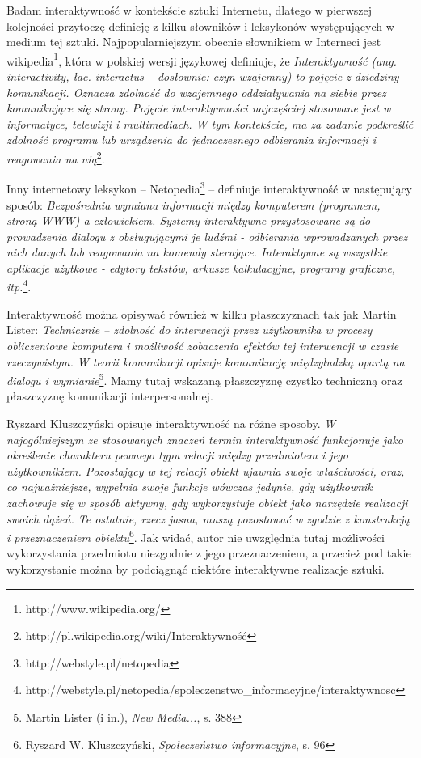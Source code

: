 \documentclass[a4paper,12pt,twoside]{article}
\begin{document}
Badam interaktywność w kontekście sztuki Internetu, dlatego
w pierwszej kolejności przytoczę definicję z kilku słowników i leksykonów
występujących w medium tej sztuki. Najpopularniejszym obecnie słownikiem
w Interneci jest wikipedia\footnote{http://www.wikipedia.org/}, która
w polskiej wersji językowej definiuje, że 
\textit{Interaktywność (ang. interactivity, łac. interactus  – dosłownie:
czyn wzajemny) to pojęcie z dziedziny komunikacji. Oznacza zdolność do
 wzajemnego oddziaływania na siebie przez komunikujące się strony.
Pojęcie interaktywności najczęściej stosowane jest w informatyce, telewizji
i multimediach. W tym kontekście, ma za zadanie podkreślić zdolność programu
lub urządzenia do jednoczesnego odbierania informacji i reagowania na
nią}\footnote{http://pl.wikipedia.org/wiki/Interaktywność}.

Inny internetowy leksykon -- Netopedia\footnote{http://webstyle.pl/netopedia}
-- definiuje interaktywność w następujący sposób:
\textit{Bezpośrednia wymiana informacji między komputerem (programem,
stroną WWW) a człowiekiem. Systemy interaktywne przystosowane są do
prowadzenia dialogu z obsługującymi je ludźmi - odbierania wprowadzanych
przez nich danych lub reagowania na komendy sterujące. Interaktywne są
wszystkie aplikacje użytkowe - edytory tekstów, arkusze kalkulacyjne,
programy graficzne, itp.}\footnote{http://webstyle.pl/netopedia/spoleczenstwo\_informacyjne/interaktywnosc}.

Interaktywność można opisywać również w kilku płaszczyznach tak jak Martin
Lister:
\textit{Technicznie -- zdolność do interwencji przez użytkownika w procesy
obliczeniowe komputera i możliwość zobaczenia efektów tej interwencji
w czasie rzeczywistym. W teorii komunikacji opisuje komunikację międzyludzką
opartą na dialogu i wymianie}\footnote{Martin Lister (i in.),
\textit{New Media...}, s. 388}.
Mamy tutaj wskazaną płaszczyznę czystko techniczną oraz płaszczyznę
komunikacji interpersonalnej.

Ryszard Kluszczyński opisuje interaktywność na różne sposoby.
\textit{W najogólniejszym ze stosowanych znaczeń termin interaktywność
funkcjonuje jako określenie charakteru pewnego typu relacji między
przedmiotem i jego użytkownikiem. Pozostający w tej relacji obiekt ujawnia
swoje właściwości, oraz, co najważniejsze, wypełnia swoje funkcje wówczas
jedynie, gdy użytkownik zachowuje się w sposób aktywny, gdy wykorzystuje
obiekt jako narzędzie realizacji swoich dążeń. Te ostatnie, rzecz jasna,
muszą pozostawać w zgodzie z konstrukcją i przeznaczeniem
obiektu}\footnote{Ryszard W. Kluszczyński,
\textit{Społeczeństwo informacyjne}, s. 96}. Jak widać, autor nie uwzględnia
tutaj możliwości wykorzystania przedmiotu niezgodnie z jego przeznaczeniem,
a przecież pod takie wykorzystanie można by podciągnąć niektóre
interaktywne realizacje sztuki.
\end{document}

